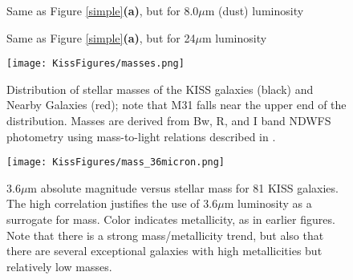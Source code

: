 \begin{figure}
\ContinuedFloat
\begin{center}
  \caption{Same as Figure \ref{simple}{\bf(a)}, but for 8.0$\mu$m (dust) luminosity}
\end{center}
\end{figure}



\begin{figure}%
\ContinuedFloat
\begin{center}
  \caption{Same as Figure \ref{simple}{\bf(a)}, but for 24$\mu$m luminosity}
\end{center}
\end{figure}




\begin{figure}%
\begin{center}
  \texttt{[image: KissFigures/masses.png]}
  \caption{Distribution of stellar masses of the KISS galaxies (black) and Nearby Galaxies (red); note that M31 falls near the upper end of the distribution. Masses are derived from Bw, R, and I band NDWFS photometry \citep{Jannuzi} using mass-to-light relations described in \cite{Bell}.
  }
\label{masses}
\end{center}
\end{figure}


\begin{figure}%
\begin{center}
  \texttt{[image: KissFigures/mass\_36micron.png]}
 \caption{3.6$\mu$m absolute magnitude versus stellar mass for 81 KISS galaxies. The high correlation justifies the use of 3.6$\mu$m luminosity as a surrogate for mass. Color indicates metallicity, as in earlier figures. Note that there is a strong mass/metallicity trend, but also that there are several 
exceptional galaxies with high metallicities but relatively low masses.}
\label{36micron_mass}
\end{center}
\end{figure}



